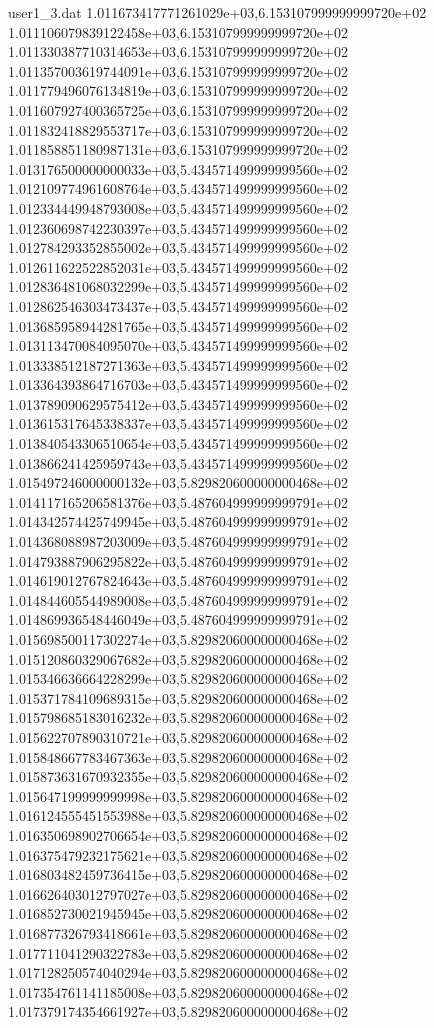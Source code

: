 \begin{filecontents}{user1_3.dat}
1.011673417771261029e+03,6.153107999999999720e+02
1.011106079839122458e+03,6.153107999999999720e+02
1.011330387710314653e+03,6.153107999999999720e+02
1.011357003619744091e+03,6.153107999999999720e+02
1.011779496076134819e+03,6.153107999999999720e+02
1.011607927400365725e+03,6.153107999999999720e+02
1.011832418829553717e+03,6.153107999999999720e+02
1.011858851180987131e+03,6.153107999999999720e+02
1.013176500000000033e+03,5.434571499999999560e+02
1.012109774961608764e+03,5.434571499999999560e+02
1.012334449948793008e+03,5.434571499999999560e+02
1.012360698742230397e+03,5.434571499999999560e+02
1.012784293352855002e+03,5.434571499999999560e+02
1.012611622522852031e+03,5.434571499999999560e+02
1.012836481068032299e+03,5.434571499999999560e+02
1.012862546303473437e+03,5.434571499999999560e+02
1.013685958944281765e+03,5.434571499999999560e+02
1.013113470084095070e+03,5.434571499999999560e+02
1.013338512187271363e+03,5.434571499999999560e+02
1.013364393864716703e+03,5.434571499999999560e+02
1.013789090629575412e+03,5.434571499999999560e+02
1.013615317645338337e+03,5.434571499999999560e+02
1.013840543306510654e+03,5.434571499999999560e+02
1.013866241425959743e+03,5.434571499999999560e+02
1.015497246000000132e+03,5.829820600000000468e+02
1.014117165206581376e+03,5.487604999999999791e+02
1.014342574425749945e+03,5.487604999999999791e+02
1.014368088987203009e+03,5.487604999999999791e+02
1.014793887906295822e+03,5.487604999999999791e+02
1.014619012767824643e+03,5.487604999999999791e+02
1.014844605544989008e+03,5.487604999999999791e+02
1.014869936548446049e+03,5.487604999999999791e+02
1.015698500117302274e+03,5.829820600000000468e+02
1.015120860329067682e+03,5.829820600000000468e+02
1.015346636664228299e+03,5.829820600000000468e+02
1.015371784109689315e+03,5.829820600000000468e+02
1.015798685183016232e+03,5.829820600000000468e+02
1.015622707890310721e+03,5.829820600000000468e+02
1.015848667783467363e+03,5.829820600000000468e+02
1.015873631670932355e+03,5.829820600000000468e+02
1.015647199999999998e+03,5.829820600000000468e+02
1.016124555451553988e+03,5.829820600000000468e+02
1.016350698902706654e+03,5.829820600000000468e+02
1.016375479232175621e+03,5.829820600000000468e+02
1.016803482459736415e+03,5.829820600000000468e+02
1.016626403012797027e+03,5.829820600000000468e+02
1.016852730021945945e+03,5.829820600000000468e+02
1.016877326793418661e+03,5.829820600000000468e+02
1.017711041290322783e+03,5.829820600000000468e+02
1.017128250574040294e+03,5.829820600000000468e+02
1.017354761141185008e+03,5.829820600000000468e+02
1.017379174354661927e+03,5.829820600000000468e+02

\end{filecontents}
